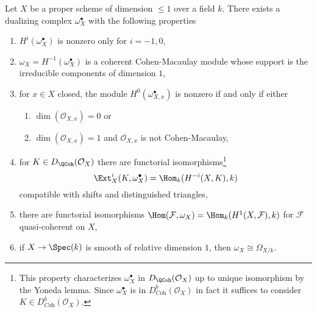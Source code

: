 \begin{lemma}
\label{lemma-duality-dim-1}
Let $X$ be a proper scheme of dimension $\leq 1$ over a field $k$.
There exists a dualizing complex $\omega_X^\bullet$ with the
following properties
\begin{enumerate}
\item $H^i(\omega_X^\bullet)$ is nonzero only for $i = -1, 0$,
\item $\omega_X = H^{-1}(\omega_X^\bullet)$
is a coherent Cohen-Macaulay module whose support is the
irreducible components of dimension $1$,
\item for $x \in X$ closed, the module $H^0(\omega_{X, x}^\bullet)$
is nonzero if and only if either
\begin{enumerate}
\item $\dim(\mathcal{O}_{X, x}) = 0$ or
\item $\dim(\mathcal{O}_{X, x}) = 1$
and $\mathcal{O}_{X, x}$ is not Cohen-Macaulay,
\end{enumerate}
\item for $K \in D_\QCoh(\mathcal{O}_X)$ there are functorial
isomorphisms\footnote{This property
characterizes $\omega_X^\bullet$ in $D_\QCoh(\mathcal{O}_X)$
up to unique isomorphism by the Yoneda lemma. Since $\omega_X^\bullet$
is in $D^b_{\textit{Coh}}(\mathcal{O}_X)$ in fact it suffices to consider
$K \in D^b_{\textit{Coh}}(\mathcal{O}_X)$.}
$$
\Ext^i_X(K, \omega_X^\bullet) = \Hom_k(H^{-i}(X, K), k)
$$
compatible with shifts and distinguished triangles,
\item there are functorial isomorphisms
$\Hom(\mathcal{F}, \omega_X) = \Hom_k(H^1(X, \mathcal{F}), k)$
for $\mathcal{F}$ quasi-coherent on $X$,
\item if $X \to \Spec(k)$ is smooth of relative dimension $1$,
then $\omega_X \cong \Omega_{X/k}$.
\end{enumerate}
\end{lemma}

